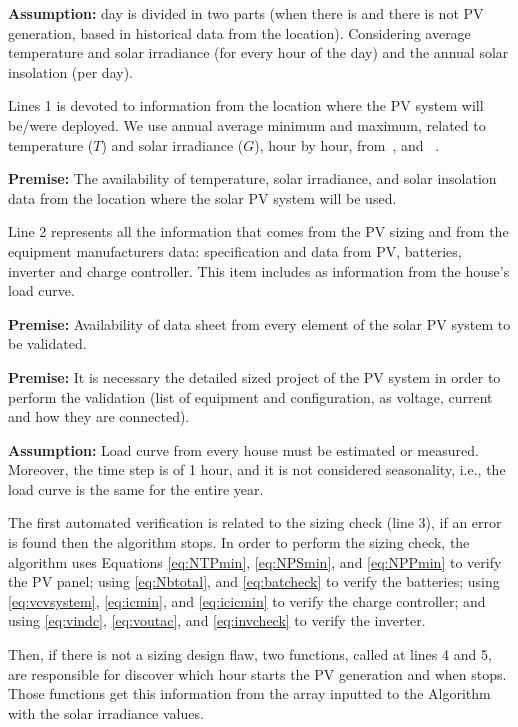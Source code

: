 \textbf{Assumption:} day is divided in two parts (when there is and there is not PV generation, based in historical data from the location). Considering average temperature and solar irradiance (for every hour of the day) and the annual solar insolation (per day).

Lines 1 is devoted to information from the location where the PV system will be/were deployed. We use annual average minimum and maximum, related to temperature ($T$) and solar irradiance ($G$), hour by hour, from~\cite{Temperature}, and ~\cite{Irradiance}.

\textbf{Premise:} The availability of temperature, solar irradiance, and solar insolation data from the location where the solar PV system will be used.

Line 2 represents all the information that comes from the PV sizing and from the equipment manufacturers data: specification and data from PV, batteries, inverter and charge controller. This item includes as information from the house's load curve.

\textbf{Premise:} Availability of data sheet from every element of the solar PV system to be validated.

\textbf{Premise:} It is necessary the detailed sized project of the PV system in order to perform the validation (list of equipment and configuration, as voltage, current and how they are connected).

\textbf{Assumption:} Load curve from every house must be estimated or measured. Moreover, the time step is of 1 hour, and it is not considered seasonality, i.e., the load curve is the same for the entire year.

The first automated verification is related to the sizing check (line 3), if an error is found then the algorithm stops. In order to perform the sizing check, the algorithm uses Equations \eqref{eq:NTPmin}, \eqref{eq:NPSmin}, and \eqref{eq:NPPmin} to verify the PV panel; using \eqref{eq:Nbtotal}, and \eqref{eq:batcheck} to verify the batteries; using \eqref{eq:vcvsystem}, \eqref{eq:icmin}, and \eqref{eq:icicmin} to verify the charge controller; and using \eqref{eq:vindc}, \eqref{eq:voutac}, and \eqref{eq:invcheck} to verify the inverter.

Then, if there is not a sizing design flaw, two functions, called at lines 4 and 5, are responsible for discover which hour starts the PV generation and when stops. Those functions get this information from the array inputted to the Algorithm with the solar irradiance values.

